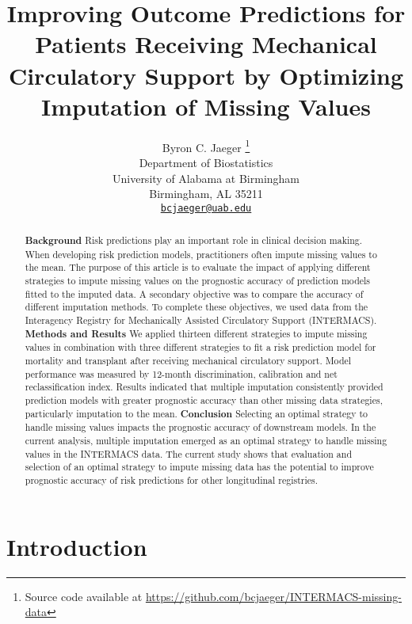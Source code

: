 \documentclass{article}
\title{Improving Outcome Predictions for Patients Receiving Mechanical
Circulatory Support by Optimizing Imputation of Missing Values}
\author{
    Byron C. Jaeger
    \thanks{Source code available at
\url{https://github.com/bcjaeger/INTERMACS-missing-data}}
   \\
    Department of Biostatistics \\
    University of Alabama at Birmingham \\
  Birmingham, AL 35211 \\
  \texttt{\href{mailto:bcjaeger@uab.edu}{\nolinkurl{bcjaeger@uab.edu}}} \\
  }
\begin{document}
\maketitle

\def\tightlist{}


\begin{abstract}
\textbf{Background} Risk predictions play an important role in clinical
decision making. When developing risk prediction models, practitioners
often impute missing values to the mean. The purpose of this article is
to evaluate the impact of applying different strategies to impute
missing values on the prognostic accuracy of prediction models fitted to
the imputed data. A secondary objective was to compare the accuracy of
different imputation methods. To complete these objectives, we used data
from the Interagency Registry for Mechanically Assisted Circulatory
Support (INTERMACS). \newline\textbf{Methods and Results} We applied
thirteen different strategies to impute missing values in combination
with three different strategies to fit a risk prediction model for
mortality and transplant after receiving mechanical circulatory support.
Model performance was measured by 12-month discrimination, calibration
and net reclassification index. Results indicated that multiple
imputation consistently provided prediction models with greater
prognostic accuracy than other missing data strategies, particularly
imputation to the mean. \newline\textbf{Conclusion} Selecting an optimal
strategy to handle missing values impacts the prognostic accuracy of
downstream models. In the current analysis, multiple imputation emerged
as an optimal strategy to handle missing values in the INTERMACS data.
The current study shows that evaluation and selection of an optimal
strategy to impute missing data has the potential to improve prognostic
accuracy of risk predictions for other longitudinal registries.
\end{abstract}


\hypertarget{introduction}{%
\section{Introduction}\label{introduction}}

\label{sec:introduction}
\end{document}
